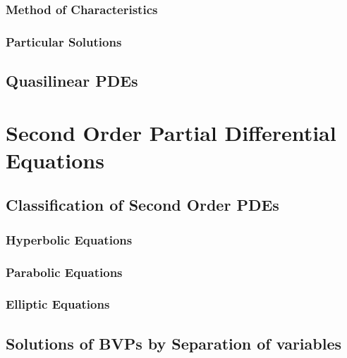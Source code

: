 \documentclass{article}
\theoremstyle{plain}
\theoremstyle{definition}
\numberwithin{equation}{section}
\begin{document}
\subsubsection{Method of Characteristics}

\subsubsection{Particular Solutions}

\subsection{Quasilinear PDEs}

\section{Second Order Partial Differential Equations}

\subsection{Classification of Second Order PDEs}

\subsubsection{Hyperbolic Equations}

\subsubsection{Parabolic Equations}

\subsubsection{Elliptic Equations}

\subsection{Solutions of BVPs by Separation of variables}
\end{document}
